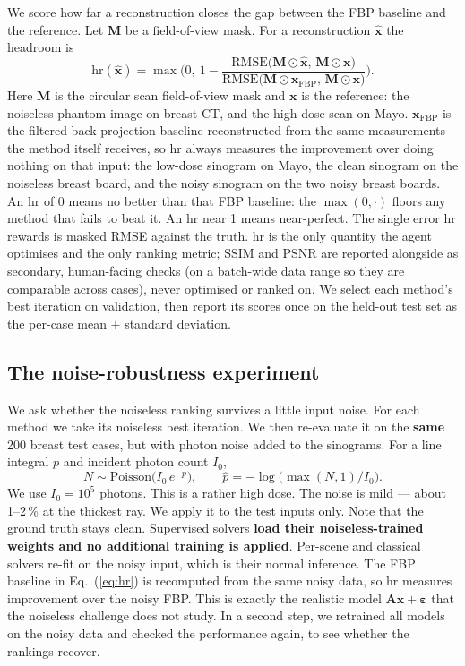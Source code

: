 \documentclass[AMA,twocolumn]{USG} %
\begin{document}
We score how far a reconstruction closes the gap between the FBP baseline and the reference. Let $\mathbf{M}$ be a field-of-view mask. For a reconstruction $\hat{\mathbf{x}}$ the headroom is
\begin{equation}\label{eq:hr}
\mathrm{hr}(\hat{\mathbf{x}})=\max\!\Big(0,\ 1-\frac{\mathrm{RMSE}\big(\mathbf{M}\!\odot\!\hat{\mathbf{x}},\,\mathbf{M}\!\odot\!\mathbf{x}\big)}{\mathrm{RMSE}\big(\mathbf{M}\!\odot\!\mathbf{x}_{\mathrm{FBP}},\,\mathbf{M}\!\odot\!\mathbf{x}\big)}\Big).
\end{equation}
Here $\mathbf{M}$ is the circular scan field-of-view mask and $\mathbf{x}$ is the reference: the noiseless phantom image on breast CT, and the high-dose scan on Mayo. $\mathbf{x}_{\mathrm{FBP}}$ is the filtered-back-projection baseline reconstructed from the same measurements the method itself receives, so hr always measures the improvement over doing nothing on that input: the low-dose sinogram on Mayo, the clean sinogram on the noiseless breast board, and the noisy sinogram on the two noisy breast boards. An hr of 0 means no better than that FBP baseline: the $\max(0,\cdot)$ floors any method that fails to beat it. An hr near 1 means near-perfect. The single error hr rewards is masked RMSE against the truth. hr is the only quantity the agent optimises and the only ranking metric; SSIM and PSNR are reported alongside as secondary, human-facing checks (on a batch-wide data range so they are comparable across cases), never optimised or ranked on. We select each method's best iteration on validation, then report its scores once on the held-out test set as the per-case mean $\pm$ standard deviation.

\subsection{The noise-robustness experiment}\label{sec:noiseexp}

We ask whether the noiseless ranking survives a little input noise. For each method we take its noiseless best iteration. We then re-evaluate it on the \textbf{same} 200 breast test cases, but with photon noise added to the sinograms. For a line integral $p$ and incident photon count $I_0$,
\begin{equation}\label{eq:noise}
N\sim\mathrm{Poisson}\big(I_0\,e^{-p}\big),\qquad \hat p=-\log\!\big(\max(N,1)/I_0\big).
\end{equation}
We use $I_0=10^5$ photons. This is a rather high dose. The noise is mild --- about 1--2\,\% at the thickest ray. We apply it to the test inputs only. Note that the ground truth stays clean. Supervised solvers \textbf{load their noiseless-trained weights and no additional training is applied}. Per-scene and classical solvers re-fit on the noisy input, which is their normal inference. The FBP baseline in Eq.~(\ref{eq:hr}) is recomputed from the same noisy data, so hr measures improvement over the noisy FBP. This is exactly the realistic model $\mathbf{A}\mathbf{x}+\boldsymbol{\varepsilon}$ that the noiseless challenge does not study. In a second step, we retrained all models on the noisy data and checked the performance again, to see whether the rankings recover.
\end{document}

